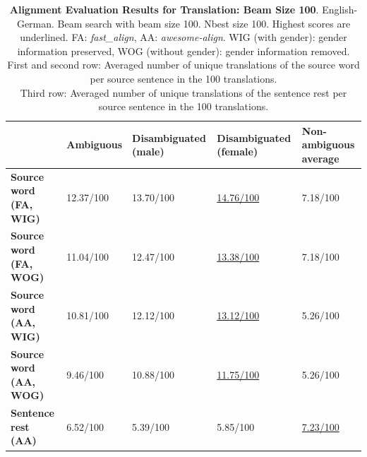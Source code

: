 \begin{table} 
    \begin{tabularx}{\linewidth}{|X|XXXX|}
        \hline
         & \textbf{Ambiguous} & \textbf{Disambiguated (male)} & \textbf{Disambiguated (female)} & \textbf{Non-ambiguous average} \\ \hline
         \textbf{Source word (FA, WIG)} & 12.37/100 & 13.70/100 & \underline{14.76/100} & 7.18/100 \\
         \textbf{Source word (FA, WOG)} & 11.04/100 & 12.47/100 & \underline{13.38/100} & 7.18/100 \\
         \textbf{Source word (AA, WIG)} & 10.81/100 & 12.12/100 & \underline{13.12/100} & 5.26/100 \\ 
         \textbf{Source word (AA, WOG)} & 9.46/100 & 10.88/100 & \underline{11.75/100} & 5.26/100 \\\hline 
         \textbf{Sentence rest (AA)} & 6.52/100 & 5.39/100 & 5.85/100 & \underline{7.23/100} \\ \hline
    \end{tabularx}
    \caption{\textbf{Alignment Evaluation Results for Translation: Beam Size 100}. English-German. Beam search with beam size 100. Nbest size 100. Highest scores are underlined. FA: \textit{fast\_align}, AA: \textit{awesome-align}. WIG (with gender): gender information preserved, WOG (without gender): gender information removed. \\ First and second row: Averaged number of unique translations of the source word per source sentence in the 100 translations. \\ Third row: Averaged number of unique translations of the sentence rest per source sentence in the 100 translations.}
    \label{tab:alignment_translation_100}
\end{table}


